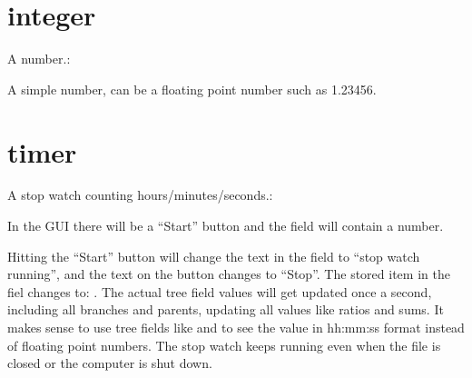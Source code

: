 \documentclass[letterpaper,10pt,english]{sphinxmanual}
\begin{document}
\section{integer}
\label{\detokenize{data-fields:integer}}
\sphinxAtStartPar
A number.:

\begin{sphinxVerbatim}[commandchars=\\\{\}]
    
\end{sphinxVerbatim}

\sphinxAtStartPar
A simple number, can be a floating point number such as \sphinxhyphen{}1.23456.


\section{timer}
\label{\detokenize{data-fields:timer}}
\sphinxAtStartPar
A stop watch counting hours/minutes/seconds.:

\begin{sphinxVerbatim}[commandchars=\\\{\}]
      
\end{sphinxVerbatim}

\sphinxAtStartPar
In the GUI there will be a “Start” button and the field will contain a number.

\sphinxAtStartPar
Hitting the “Start” button will change the text in the field to “stop watch running”, and the text on the button changes to “Stop”. The stored item in the fiel changes to: . The actual tree field values will get updated once a second, including all branches and parents, updating all values like ratios and sums. It makes sense to use tree fields like  and  to see the value in hh:mm:ss format instead of floating point numbers. The stop watch keeps running even when the file is closed or the computer is shut down.
\end{document}
